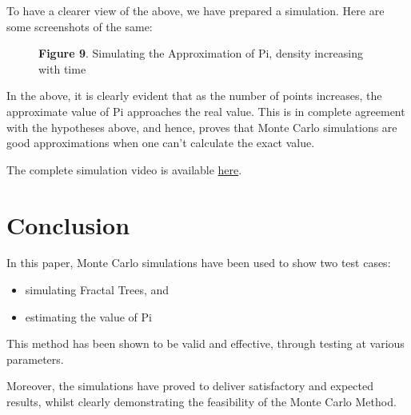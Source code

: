 \documentclass{resonance}
\begin{document}
To have a clearer view of the above, we have prepared a simulation. Here are some screenshots of the same:

\pagebreak

\begin{figure}
	\hskip 0.7cm
    \vspace{20pt}
    \fbox{\texttt{[image: pi\_ss\_1]}}
    \fbox{\texttt{[image: pi\_ss\_2]}}
    \fbox{\texttt{[image: pi\_ss\_3]}}
    
    \vspace{-10pt}
    \hspace{30pt}\scriptsize{\textbf{Figure 9}. \normalfont Simulating the Approximation of Pi, density increasing with time}\\
\end{figure}

In the above, it is clearly evident that as the number of points increases, the approximate value of Pi approaches the real value. This is in complete agreement with the hypotheses above, and hence, proves that Monte Carlo simulations are good approximations when one can’t calculate the exact value.


The complete simulation video is available \textcolor{blue}{\href{https://bit.ly/pi_approximation}{here}}.

\section{Conclusion}
In this paper, Monte Carlo simulations have been used to show two test cases:
\begin{itemize}
\item simulating Fractal Trees, and
\item estimating the value of Pi
\end{itemize}

This method has been shown to be valid and effective, through testing at various parameters.

Moreover, the simulations have proved to deliver satisfactory and expected results, whilst clearly demonstrating the feasibility of the Monte Carlo Method.\\\\\\\\\\\\\\\\
\end{document}
